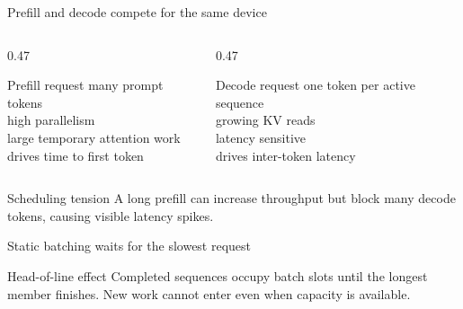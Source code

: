 \documentclass[handout]{beamer}
\begin{document}
\begin{frame}{Prefill and decode compete for the same device}
  \begin{columns}[t]
    \begin{column}{0.47\linewidth}
      \begin{block}{Prefill request}
        many prompt tokens\\high parallelism\\large temporary attention work\\drives time to first token
      \end{block}
    \end{column}
    \begin{column}{0.47\linewidth}
      \begin{block}{Decode request}
        one token per active sequence\\growing KV reads\\latency sensitive\\drives inter-token latency
      \end{block}
    \end{column}
  \end{columns}
  \begin{alertblock}{Scheduling tension}
    A long prefill can increase throughput but block many decode tokens, causing visible latency spikes.
  \end{alertblock}
\end{frame}

\begin{frame}{Static batching waits for the slowest request}
  \begin{center}
  \end{center}
  \begin{alertblock}{Head-of-line effect}
    Completed sequences occupy batch slots until the longest member finishes. New work cannot enter even when capacity is available.
  \end{alertblock}
\end{frame}
\end{document}
